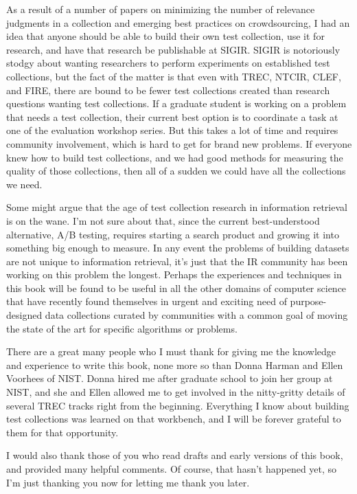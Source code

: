 \documentclass[nobib]{tufte-book}
\begin{document}
As a result of a number of papers on minimizing the number of relevance judgments in a collection and emerging best practices on crowdsourcing, I had an idea that anyone should be able to build their own test collection, use it for research, and have that research be publishable at SIGIR.  SIGIR is notoriously stodgy about wanting researchers to perform experiments on established test collections, but the fact of the matter is that even with TREC, NTCIR, CLEF, and FIRE, there are bound to be fewer test collections created than research questions wanting test collections.  If a graduate student is working on a problem that needs a test collection, their current best option is to coordinate a task at one of the evaluation workshop series.  But this takes a lot of time and requires community involvement, which is hard to get for brand new problems.  If everyone knew how to build test collections, and we had good methods for measuring the quality of those collections, then all of a sudden we could have all the collections we need.

Some might argue that the age of test collection research in information retrieval is on the wane.  I'm not sure about that, since the current best-understood alternative, A/B testing, requires starting a search product and growing it into something big enough to measure. In any event the problems of building datasets are not unique to information retrieval, it's just that the IR community has been working on this problem the longest.  Perhaps the experiences and techniques in this book will be found to be useful in all the other domains of computer science that have recently found themselves in urgent and exciting need of purpose-designed data collections curated by communities with a common goal of moving the state of the art for specific algorithms or problems.

There are a great many people who I must thank for giving me the knowledge and experience to write this book, none more so than Donna Harman and Ellen Voorhees of NIST.  Donna hired me after graduate school to join her group at NIST, and she and Ellen allowed me to get involved in the nitty-gritty details of several TREC tracks right from the beginning.  Everything I know about building test collections was learned on that workbench, and I will be forever grateful to them for that opportunity.

I would also thank those of you who read drafts and early versions of this book, and provided many helpful comments.  Of course, that hasn't happened yet, so I'm just thanking you now for letting me thank you later.
\end{document}
